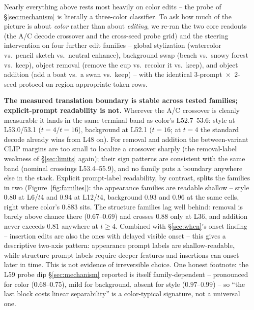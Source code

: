 \documentclass[10pt,twocolumn,letterpaper]{article}
\begin{document}
Nearly everything above rests most heavily on color edits -- the probe
of \S\ref{sec:mechanism} is literally a three-color classifier. To ask
how much of the picture is about \emph{color} rather than about
\emph{editing}, we re-ran the two core readouts (the A/C decode
crossover and the cross-seed probe grid) and the steering intervention
on four further edit families -- global stylization (watercolor vs.\
pencil sketch vs.\ neutral enhance), background swap (beach vs.\ snowy
forest vs.\ keep), object removal (remove the cup vs.\ recolor it vs.\
keep), and object addition (add a boat vs.\ a swan vs.\ keep) -- with
the identical 3-prompt~$\times$~2-seed protocol on region-appropriate
token rows.

\textbf{The measured translation boundary is stable across tested
families; explicit-prompt readability is not.} Wherever the A/C crossover is cleanly measurable it lands in the
same terminal band as color's L52.7--53.6: style at L53.0/53.1
($t{=}4$/$t{=}16$), background at L52.1 ($t{=}16$; at $t{=}4$ the
standard decode already wins from L48 on). For removal and addition the between-variant CLIP margins are
too small to localize a crossover sharply (the removal-label weakness of
\S\ref{sec:limits} again); their sign patterns are consistent with the
same band (nominal crossings L53.4--55.9), and no family puts a boundary
anywhere else in the stack. Explicit prompt-label readability, by contrast,
splits the families in two (Figure~\ref{fig:families}): the appearance
families are readable shallow -- style $0.80$ at L6/$t$4 and $0.94$ at
L12/$t$4, background $0.93$ and $0.96$ at the same cells, right where
color's $0.883$ sits. The structure families lag well behind: removal
is barely above chance there ($0.67$--$0.69$) and crosses $0.88$ only
at L36, and addition never exceeds $0.81$ anywhere at $t\ge4$.
Combined with \S\ref{sec:when}'s onset finding -- insertion edits are
also the ones with delayed visible onset -- this gives a descriptive
two-axis pattern: appearance prompt labels are shallow-readable, while
structure prompt labels require deeper features and insertions can onset
later in time. This is not evidence of irreversible choice. One honest footnote: the
L59 probe dip \S\ref{sec:mechanism} reported is itself family-dependent
-- pronounced for color ($0.68$--$0.75$), mild for background, absent
for style ($0.97$--$0.99$) -- so ``the last block costs linear
separability'' is a color-typical signature, not a universal one.
\end{document}

